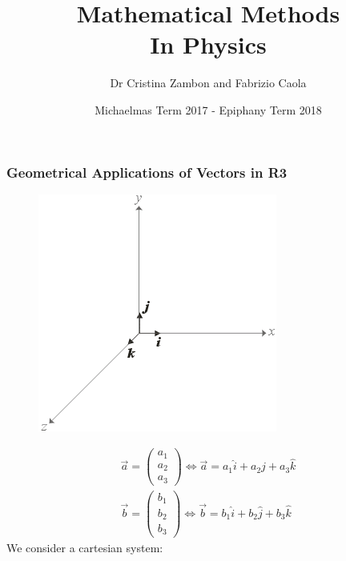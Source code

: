 \documentclass[a4paper, 11pt, normalem]{report}
\title{Mathematical Methods \\ In Physics \vspace{-20pt}}
\author{Dr Cristina Zambon and Fabrizio Caola}
\date{\vspace{-15pt}Michaelmas Term 2017 - Epiphany Term 2018}
\begin{document}
\maketitle
\tableofcontents

\part{}
\chapter{}
\section{Geometrical Applications of Vectors in R3}
\begin{figure}
    \begin{center}
        \includegraphics[scale=0.5]{Cart.png}
    \end{center}
\end{figure}
\begin{gather*}
    \vec{a} =
    \begin{pmatrix}
        a_1 \\
        a_2 \\
        a_3
    \end{pmatrix}
    \iff
    \vec{a} = a_{1}\hat{i} + a_{2}\hat{j} + a_{3}\hat{k} \\
    \vec{b} =
    \begin{pmatrix}
        b_1 \\
        b_2 \\
        b_3
    \end{pmatrix}
    \iff
    \vec{b} = b_{1}\hat{i} + b_{2}\hat{j} + b_{3}\hat{k}
\end{gather*}
We consider a cartesian system:
\end{document}
